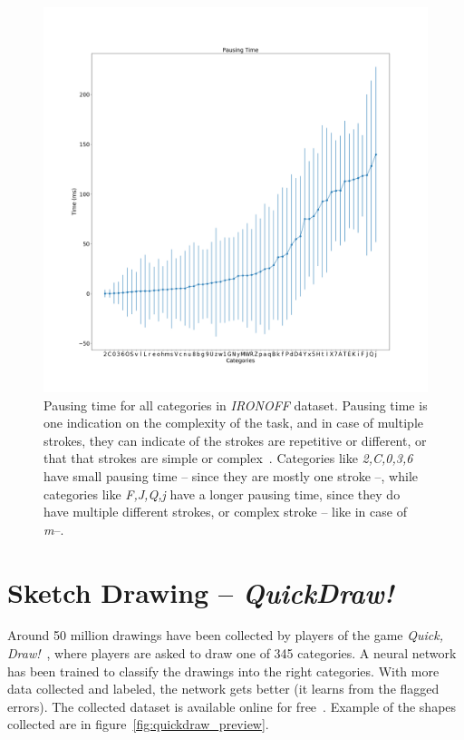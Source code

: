 \begin{figure}
    \centering
    \includegraphics[scale=0.35]{images/dataset/pausing_time.png}
    \caption{Pausing time for all categories in \textit{IRONOFF} dataset. Pausing time is one indication on the complexity of the task, and in case of multiple strokes, they can indicate of the strokes are repetitive or different, or that that strokes are simple or complex~\citep{seraphin2019analyzing}. Categories like \textit{2,C,0,3,6} have small pausing time -- since they are mostly one stroke --, while categories like \textit{F,J,Q,j} have a longer pausing time, since they do have multiple different strokes, or complex stroke -- like in case of \textit{m}--.}
    \label{fig:ironoff_pausingtime}
\end{figure}

\section{Sketch Drawing -- \textit{QuickDraw!}}
\par Around 50 million drawings have been collected by players of the game \textit{Quick, Draw!}~\citep{quickdrawgame}, where players are asked to draw one of 345 categories. A neural network has been trained to classify the drawings into the right categories. With more data collected and labeled, the network gets better (it learns from the flagged errors). The collected dataset is available online for free~\citep{quickdraw}. Example of the shapes collected are in figure~\ref{fig:quickdraw_preview}.

